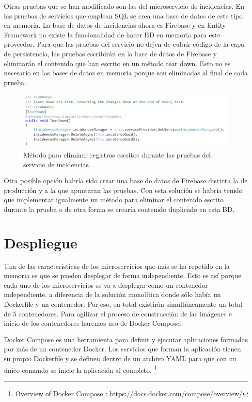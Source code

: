 \documentclass[11pt,spanish,listoffigures]{tfgetsinf}
\begin{document}
Otras pruebas que se han modificado son las del microservicio de incidencias. En las pruebas de servicios que emplean SQL se crea una base de datos de este tipo en memoria. La base de datos de incidencias ahora es Firebase y en Entity Framework no existe la funcionalidad de hacer BD en memoria para este proveedor. Para que las pruebas del servicio no dejen de cubrir código de la capa de persistencia, las pruebas escribirán en la base de datos de Firebase y eliminarán el contenido que han escrito en un método tear down. Esto no es necesario en las bases de datos en memoria porque son eliminadas al final de cada prueba.

\begin{figure}[h]
\centering
\includegraphics[scale=0.6]{TearDown}
\caption{Método para eliminar registros escritos durante las pruebas del servicio de incidencias.}
\end{figure}

Otra posible opción habría sido crear una base de datos de Firebase distinta la de producción y a la que apuntaran las pruebas. Con esta solución se habría tenido que implementar igualmente un método para eliminar el contenido escrito durante la prueba o de otra forma se crearía contenido duplicado en esta BD.

\section{Despliegue}

Una de las características de los microservicios que más se ha repetido en la memoria es que se pueden desplegar de forma independiente. Esto es así porque cada uno de los microservicios se va a desplegar como un contenedor independiente, a diferencia de la solución monolítica donde sólo había un Dockerfile y un contenedor. Por eso, en total existirán simultáneamente un total de 5 contenedores. Para agilizar el proceso de construcción de las imágenes e inicio de los contenedores haremos uso de Docker Compose. 

Docker Compose es una herramienta para definir y ejecutar aplicaciones formadas por más de un contenedor Docker. Los servicios que forman la aplicación tienen su propio Dockerfile y se definen dentro de un archivo YAML para que con un único comando se inicie la aplicación al completo. \footnote{ Overview of Docker Compose
: https://docs.docker.com/compose/overview/} 
\end{document}
